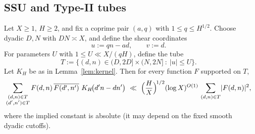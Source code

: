 \subsection{SSU and Type-II tubes}
\begin{theorem}\label{thm:SSU}
Let $X\ge 1$, $H\ge 2$, and fix a coprime pair $(a,q)$ with $1\le q\le H^{1/2}$.
Choose dyadic $D,N$ with $DN\asymp X$, and define the shear coordinates
\[
u := qn - a d,\qquad v := d.
\]
For parameters $U$ with $1\le U \ll X/(qH)$, define the tube
\[
T := \bigl\{(d,n)\in (D,2D]\times(N,2N]\ :\ |u|\le U\bigr\}.
\]
Let $K_H$ be as in Lemma~\ref{lem:kernel}. Then for every function $F$ supported on $T$,
\begin{equation}\label{eq:SSU-main}
\sum_{\substack{(d,n)\in T\\(d',n')\in T}}
F(d,n)\,\overline{F(d',n')}\ K_H\!\bigl(d'n-dn'\bigr)
\ \ll\ \Bigl(\frac{H}{X}\Bigr)^{\!1/2}(\log X)^{O(1)}\,
\sum_{(d,n)\in T}\!|F(d,n)|^2,
\end{equation}
where the implied constant is absolute (it may depend on the fixed smooth dyadic cutoffs).
\end{theorem}

